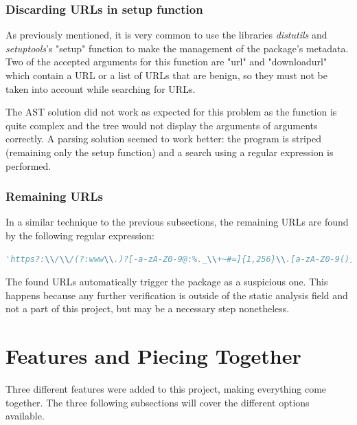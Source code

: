 \subsubsection{Discarding URLs in setup function}
As previously mentioned, it is very common to use the libraries \textit{distutils} and \textit{setuptools}'s "setup" function to make the management of the package's metadata. Two of the accepted arguments for this function are "url" and "downloadurl" which contain a URL or a list of URLs that are benign, so they must not be taken into account while searching for URLs.

The AST solution did not work as expected for this problem as the function is quite complex and the tree would not display the arguments of arguments correctly. A parsing solution seemed to work better: the program is striped (remaining only the setup function) and a search using a regular expression is performed.

\subsubsection{Remaining URLs}
In a similar technique to the previous subsections, the remaining URLs are found by the following regular expression:
\begin{lstlisting}[language=python]
  'https?:\\/\\/(?:www\\.)?[-a-zA-Z0-9@:%._\\+~#=]{1,256}\\.[a-zA-Z0-9()]{1,6}\\b(?:[-a-zA-Z0-9()@:%_\\+.~#?&\\/=]*)
\end{lstlisting}
The found URLs automatically trigger the package as a suspicious one. This happens because any further verification is outside of the static analysis field and not a part of this project, but may be a necessary step nonetheless.

\section{Features and Piecing Together}
Three different features were added to this project, making everything come together. The three following subsections will cover the different options available.

